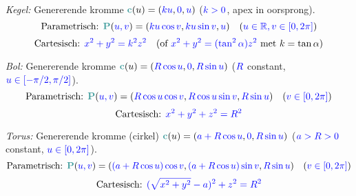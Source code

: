 \documentclass[12pt]{article}
\renewcommand{\vec}[1]{\textcolor{vectorTeal}{\mathbf{#1}}}
\newcommand{\scalar}[1]{\textcolor{scalarBrightBlue}{#1}}
\begin{document}
\vspace{1em}
\textit{Kegel:} Genererende kromme $\vec{c}(u) = (\scalar{k u}, \scalar{0}, \scalar{u})$ ($\scalar{k>0}$, apex in oorsprong).
\[
\text{Parametrisch: } \vec{P}(\scalar{u, v}) = (\scalar{k u \cos v}, \scalar{k u \sin v}, \scalar{u}) \quad (\scalar{u \in \mathbb{R}, v \in [0, 2\pi]})
\]
\[
\text{Cartesisch: } \scalar{x^2 + y^2 = k^2 z^2} \quad \text{(of } \scalar{x^2+y^2 = (\tan^2 \alpha) z^2} \text{ met } k = \tan \alpha)
\]

\vspace{1em}
\textit{Bol:} Genererende kromme $\vec{c}(u) = (\scalar{R \cos u}, \scalar{0}, \scalar{R \sin u})$ ($\scalar{R}$ constant, $\scalar{u \in [-\pi/2, \pi/2]}$).
\[
\text{Parametrisch: } \vec{P}(\scalar{u, v}) = (\scalar{R \cos u \cos v}, \scalar{R \cos u \sin v}, \scalar{R \sin u}) \quad (\scalar{v \in [0, 2\pi]})
\]
\[
\text{Cartesisch: } \scalar{x^2 + y^2 + z^2 = R^2}
\]

\vspace{1em}
\textit{Torus:} Genererende kromme (cirkel) $\vec{c}(u) = (\scalar{a + R \cos u}, \scalar{0}, \scalar{R \sin u})$ ($\scalar{a > R > 0}$ constant, $\scalar{u \in [0, 2\pi]}$).
\[
\text{Parametrisch: } \vec{P}(\scalar{u, v}) = (\scalar{(a + R \cos u) \cos v}, \scalar{(a + R \cos u) \sin v}, \scalar{R \sin u}) \quad (\scalar{v \in [0, 2\pi]})
\]
\[
\text{Cartesisch: } \scalar{(\sqrt{x^2+y^2} - a)^2 + z^2 = R^2}
\]
\end{document}
